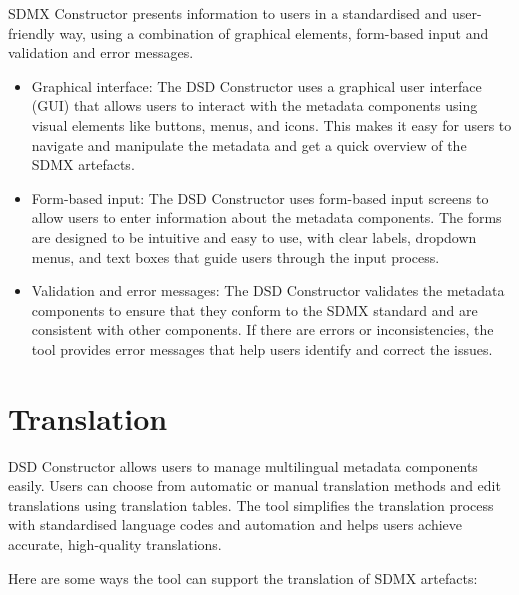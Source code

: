 \documentclass[
]{book}
\providecommand{\tightlist}{%
  \setlength{\itemsep}{0pt}\setlength{\parskip}{0pt}}
\begin{document}
SDMX Constructor presents information to users in a standardised and user-friendly way, using a combination of graphical elements, form-based input and validation and error messages.

\begin{itemize}
\tightlist
\item
  Graphical interface: The DSD Constructor uses a graphical user interface (GUI) that allows users to interact with the metadata components using visual elements like buttons, menus, and icons. This makes it easy for users to navigate and manipulate the metadata and get a quick overview of the SDMX artefacts.
\item
  Form-based input: The DSD Constructor uses form-based input screens to allow users to enter information about the metadata components. The forms are designed to be intuitive and easy to use, with clear labels, dropdown menus, and text boxes that guide users through the input process.
\item
  Validation and error messages: The DSD Constructor validates the metadata components to ensure that they conform to the SDMX standard and are consistent with other components. If there are errors or inconsistencies, the tool provides error messages that help users identify and correct the issues.
\end{itemize}

\hypertarget{translation}{%
\section{Translation}\label{translation}}

DSD Constructor allows users to manage multilingual metadata components easily. Users can choose from automatic or manual translation methods and edit translations using translation tables. The tool simplifies the translation process with standardised language codes and automation and helps users achieve accurate, high-quality translations.

Here are some ways the tool can support the translation of SDMX artefacts:
\end{document}
